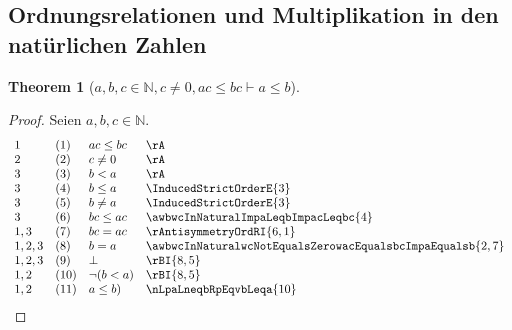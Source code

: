 \documentclass{book}
\theoremstyle{plain}
\newtheorem{theorem}{Theorem}
\theoremstyle{remark}
\theoremstyle{definition}
\begin{document}
\subsection{Ordnungsrelationen und Multiplikation in den natürlichen Zahlen}

\label{awbwcInNaturalwcNotEqualsZerowacLeqbcImpaLeqb}
\begin{theorem}[\(a,b,c\in\mathbb{N},c\neq 0, ac\leq bc\vdash a\leq b\)]
\end{theorem}
\begin{proof}
Seien \(a,b,c\in\mathbb{N}\).
       \[
	\begin{array}{lllcll}
            1       &  (1)  & \multicolumn{3}{l}{ac\leq bc} & \rA \\
            2       &  (2)  & \multicolumn{3}{l}{c\neq 0} & \rA \\
            3       &  (3)  & \multicolumn{3}{l}{b<a} & \rA \\       
            3       &  (4)  & \multicolumn{3}{l}{b\leq a} & \InducedStrictOrderE{3} \\   
            3       &  (5)  & \multicolumn{3}{l}{b\neq a} & \InducedStrictOrderE{3} \\   
            3       &  (6)  & \multicolumn{3}{l}{bc\leq ac} & \awbwcInNaturalImpaLeqbImpacLeqbc{4} \\ 
            1,3       &  (7)  & \multicolumn{3}{l}{bc=ac} & \rAntisymmetryOrdRI{6,1} \\  
            1,2,3     &  (8)  & \multicolumn{3}{l}{b=a} & \awbwcInNaturalwcNotEqualsZerowacEqualsbcImpaEqualsb{2,7} \\  
            1,2,3     &  (9)  & \multicolumn{3}{l}{\bot} & \rBI{8,5} \\  
            1,2       &  (10)  & \multicolumn{3}{l}{\neg(b<a)} & \rBI{8,5} \\  
            1,2       &  (11)  & \multicolumn{3}{l}{a\leq b)} & \nLpaLneqbRpEqvbLeqa{10} \\   
	\end{array}
        \]
\end{proof}
\end{document}
